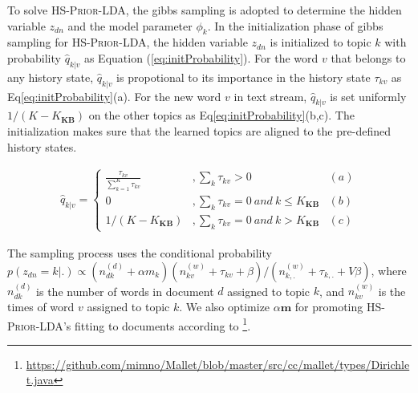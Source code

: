 \documentclass{article}
\begin{document}
To solve \textsc{HS-Prior-LDA}, the gibbs sampling is adopted to determine the hidden variable \(z_{dn}\) and the model parameter \(\phi_k\).
In the initialization phase of gibbs sampling for \textsc{HS-Prior-LDA}, the hidden variable \(z_{dn}\) is initialized to topic \(k\) with probability \(\hat{q}_{k|v}\) as Equation (\ref{eq:initProbability}).
For the word \(v\) that belongs to any history state, \(\hat{q}_{k|v}\) is propotional to its importance in the history state \(\tau_{kv}\) as Eq\ref{eq:initProbability}(a). 
For the new word \(v\) in text stream, \(\hat{q}_{k|v}\) is   set uniformly \(1/(K-K_{\bm{KB}})\) on the other topics as Eq\ref{eq:initProbability}(b,c). 
The initialization makes sure that the learned topics are aligned to the pre-defined history states.
\begin{scriptsize} 
\begin{equation}
\label{eq:initProbability}
\begin{aligned}
\hat{q}_{k|v}=
\left\{ \begin{aligned}
\frac{\tau_{kv}}{\sum_{k=1}^{K}\tau_{kv}} &,\sum_{k}\tau_{kv}>0 & (a)\\
0&, \sum_{k}\tau_{kv}=0 \ and \ k \leq K_{\bm{KB}} & (b)\\
1/(K-K_{\bm{KB}})&,\sum_{k}\tau_{kv}=0 \ and \ k > K_{\bm{KB}} & (c)
\end{aligned}\right.
\end{aligned}
\end{equation}
\end{scriptsize}

The sampling process uses the conditional probability \(p(z_{dn}=k|.)\propto (n^{(d)}_{dk}+\alpha m_k)(n^{(w)}_{kv}+\tau_{kv}+\beta)/(n^{(w)}_{k,.}+\tau_{k,.}+V\beta)\), where \(n^{(d)}_{dk}\) is the number of words in document \(d\) assigned to topic \(k\), and \(n^{(w)}_{kv}\) is the times of word \(v\) assigned to topic \(k\).
We also optimize \(\alpha \bm{m}\) for promoting \textsc{HS-Prior-LDA}'s fitting to documents according to \cite{wallach2008structured}\footnote{\url{https://github.com/mimno/Mallet/blob/master/src/cc/mallet/types/Dirichlet.java}}.
\end{document}
